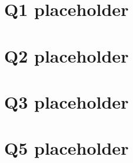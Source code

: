 \documentclass[11pt]{article}
\begin{document}
\section{Q1 placeholder}
\section{Q2 placeholder}
\section{Q3 placeholder}

\section{Q5 placeholder}
\end{document}
